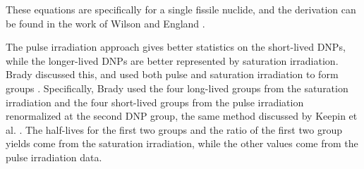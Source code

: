 These equations are specifically for a single fissile nuclide, and the derivation can be found in the work of Wilson and England \cite{wilson2002delayed}.








The pulse irradiation approach gives better statistics on the short-lived \glspl{DNP}, while the longer-lived \glspl{DNP} are better represented by saturation irradiation.
Brady discussed this, and used both pulse and saturation irradiation to form groups \cite{brady1988evaluation}.
Specifically, Brady used the four long-lived groups from the saturation irradiation and the four short-lived groups from the pulse irradiation renormalized at the second \gls{DNP} group, the same method discussed by Keepin et al. \cite{keepin1957delayed}.
The half-lives for the first two groups and the ratio of the first two group yields come from the saturation irradiation, while the other values come from the pulse irradiation data.

